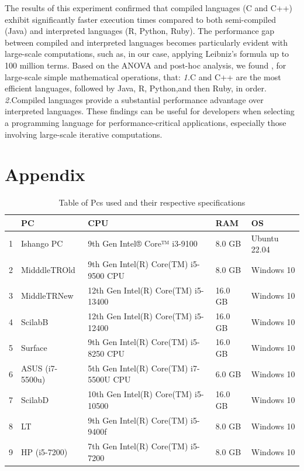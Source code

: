 \documentclass[12pt,halfline,a4paper,]{ouparticle}
\begin{document}
The results of this experiment confirmed that compiled languages (C and
C++) exhibit significantly faster execution times compared to both
semi-compiled (Java) and interpreted languages (R, Python, Ruby). The
performance gap between compiled and interpreted languages becomes
particularly evident with large-scale computations, such as, in our
case, applying Leibniz's formula up to 100 million terms. Based on the
ANOVA and post-hoc analysis, we found , for large-scale simple
mathematical operations, that: \emph{1.}C and C++ are the most efficient
languages, followed by Java, R, Python,and then Ruby, in order.
\emph{2.}Compiled languages provide a substantial performance advantage
over interpreted languages. These findings can be useful for developers
when selecting a programming language for performance-critical
applications, especially those involving large-scale iterative
computations.

\newpage

\section{Appendix}\label{appendix}

\begin{table}[ht]
\centering
\begin{tabular}{rllll}
  \hline
 & PC & CPU & RAM & OS \\ 
  \hline
1 & Ishango PC &  9th Gen Intel® Core™ i3-9100  &  8.0 GB  & Ubuntu 22.04 \\ 
  2 & MidddleTROld &  9th Gen Intel(R) Core(TM) i5-9500 CPU  &  8.0 GB  &   Windows 10 \\ 
  3 & MiddleTRNew  &  12th Gen Intel(R) Core(TM) i5-13400  &  16.0 GB  &   Windows 10 \\ 
  4 & ScilabB  &   12th Gen Intel(R) Core(TM) i5-12400  &   16.0 GB   &   Windows 10 \\ 
  5 & Surface  &   9th Gen Intel(R) Core(TM) i5-8250 CPU  &   16.0 GB   &   Windows 10 \\ 
  6 & ASUS (i7-5500u)  &   5th Gen Intel(R) Core(TM) i7-5500U CPU  &   6.0 GB   &   Windows 10 \\ 
  7 & ScilabD  &   10th Gen Intel(R) Core(TM) i5-10500  &   16.0 GB   &   Windows 10 \\ 
  8 & LT  &   9th Gen Intel(R) Core(TM) i5-9400f  &   8.0 GB   &   Windows 10 \\ 
  9 & HP (i5-7200)  &   7th Gen Intel(R) Core(TM) i5-7200  &   8.0 GB   &   Windows 10 \\ 
   \hline
\end{tabular}
\caption{Table of Pcs used and their respective specifications} 
\end{table}
\end{document}
